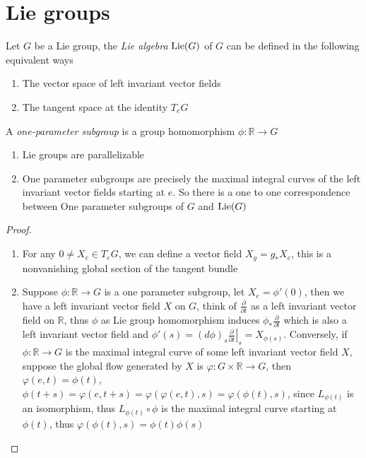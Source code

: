 \documentclass[main]{subfiles}
\begin{document}
\tableofcontents
\newpage

\section{Lie groups}

\begin{definition}
Let $G$ be a Lie group, the \textit{Lie algebra} $\operatorname{Lie}(G)$ of $G$ can be defined in the following equivalent ways
\begin{enumerate}
\item The vector space of left invariant vector fields
\item The tangent space at the identity $T_eG$
\end{enumerate}
\end{definition}

\begin{definition}
A \textit{one-parameter subgroup} is a group homomorphism $\phi:\mathbb R\to G$
\end{definition}

\begin{proposition}\hfill
\begin{enumerate}
\item Lie groups are parallelizable
\item One parameter subgroups are precisely the maximal integral curves of the left invariant vector fields starting at $e$. So there is a one to one correspondence between One parameter subgroups of $G$ and $\operatorname{Lie}(G)$
\end{enumerate}
\end{proposition}

\begin{proof}
\begin{enumerate}
\item For any $0\neq X_e\in T_eG$, we can define a vector field $X_g=g_*X_e$, this is a nonvanishing global section of the tangent bundle
\item Suppose $\phi:\mathbb R\to G$ is a one parameter subgroup, let $X_e=\phi'(0)$, then we have a left invariant vector field $X$ on $G$, think of $\frac{\partial}{\partial t}$ as a left invariant vector field on $\mathbb R$, thus $\phi$ as Lie group homomorphism induces $\phi_*\frac{\partial}{\partial t}$ which is also a left invariant vector field and $\phi'(s)=(d\phi)_s\left.\frac{\partial}{\partial t}\right|_s=X_{\phi(s)}$. Conversely, if $\phi:\mathbb R\to G$ is the maximal integral curve of some left invariant vector field $X$, suppose the global flow generated by $X$ is $\varphi:G\times\mathbb R\to G$, then $\varphi(e,t)=\phi(t)$, $\phi(t+s)=\varphi(e,t+s)=\varphi(\varphi(e,t),s)=\varphi(\phi(t),s)$, since $L_{\phi(t)}$ is an isomorphism, thus $L_{\phi(t)}\circ\phi$ is the maximal integral curve starting at $\phi(t)$, thus $\varphi(\phi(t),s)=\phi(t)\phi(s)$
\end{enumerate}
\end{proof}
\end{document}
